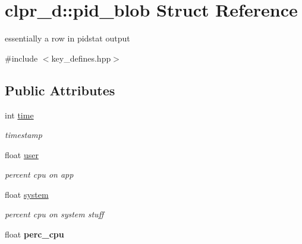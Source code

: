 \hypertarget{structclpr__d_1_1pid__blob}{\section{clpr\-\_\-d\-:\-:pid\-\_\-blob \-Struct \-Reference}
\label{structclpr__d_1_1pid__blob}
}


essentially a row in pidstat output  




{\ttfamily \#include $<$key\-\_\-defines.\-hpp$>$}

\subsection*{\-Public \-Attributes}
\begin{DoxyCompactItemize}
\item 
\hypertarget{structclpr__d_1_1pid__blob_a6e86f5c748557ac4e0f1ba6cbb518f28}{int \hyperlink{structclpr__d_1_1pid__blob_a6e86f5c748557ac4e0f1ba6cbb518f28}{time}}\label{structclpr__d_1_1pid__blob_a6e86f5c748557ac4e0f1ba6cbb518f28}

\begin{DoxyCompactList}\small\item\em timestamp \end{DoxyCompactList}\item 
\hypertarget{structclpr__d_1_1pid__blob_ac8d0ea31b236729da0b5c60796ac03b0}{float \hyperlink{structclpr__d_1_1pid__blob_ac8d0ea31b236729da0b5c60796ac03b0}{user}}\label{structclpr__d_1_1pid__blob_ac8d0ea31b236729da0b5c60796ac03b0}

\begin{DoxyCompactList}\small\item\em percent cpu on app \end{DoxyCompactList}\item 
\hypertarget{structclpr__d_1_1pid__blob_a4789a89b61e45f17882b85d1aba9f21b}{float \hyperlink{structclpr__d_1_1pid__blob_a4789a89b61e45f17882b85d1aba9f21b}{system}}\label{structclpr__d_1_1pid__blob_a4789a89b61e45f17882b85d1aba9f21b}

\begin{DoxyCompactList}\small\item\em percent cpu on system stuff \end{DoxyCompactList}\item 
\hypertarget{structclpr__d_1_1pid__blob_acd4d69a0dc0b313eef0badbea3bc126c}{float {\bfseries perc\-\_\-cpu}}\label{structclpr__d_1_1pid__blob_acd4d69a0dc0b313eef0badbea3bc126c}


\end{DoxyCompactItemize}
